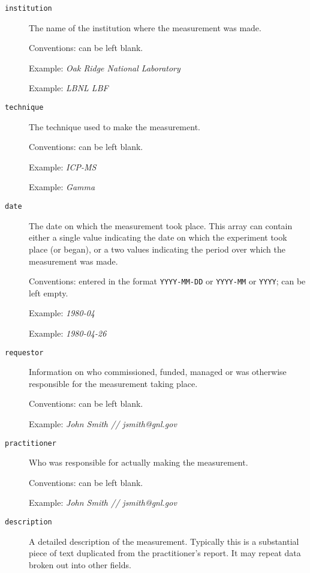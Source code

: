 \documentclass[11pt, letterpaper]{article}
\begin{document}
\newpage
\begin{description}

  \item[\texttt{institution}] The name of the institution where the measurement was made.

  Conventions: can be left blank.
  
  Example: \textit{Oak Ridge National Laboratory}
  
  Example: \textit{LBNL LBF}

  \item[\texttt{technique}] The technique used to make the measurement.

  Conventions: can be left blank.
  
  Example: \textit{ICP-MS}
  
  Example: \textit{Gamma}

  \item[\texttt{date}] The date on which the measurement took place. This array can contain either a single value indicating the date on which the experiment took place (or began), or a two values indicating the period over which the measurement was made.

  Conventions: entered in the format \texttt{YYYY-MM-DD} or \texttt{YYYY-MM} or \texttt{YYYY}; can be left empty.

  Example: \textit{1980-04}

  Example: \textit{1980-04-26}

  \item[\texttt{requestor}] Information on who commissioned, funded, managed or was otherwise responsible for the measurement taking place.

  Conventions: can be left blank.
  
  Example: \textit{John Smith // jsmith@gnl.gov}     

  \item[\texttt{practitioner}] Who was responsible for actually making the measurement.

  Conventions: can be left blank.
  
  Example: \textit{John Smith // jsmith@gnl.gov}  
  
  \newpage
  
  \item[\texttt{description}] A detailed description of the measurement. Typically this is a substantial piece of text duplicated from the practitioner's report. It may repeat data broken out into other fields.


\end{description}
\end{document}
